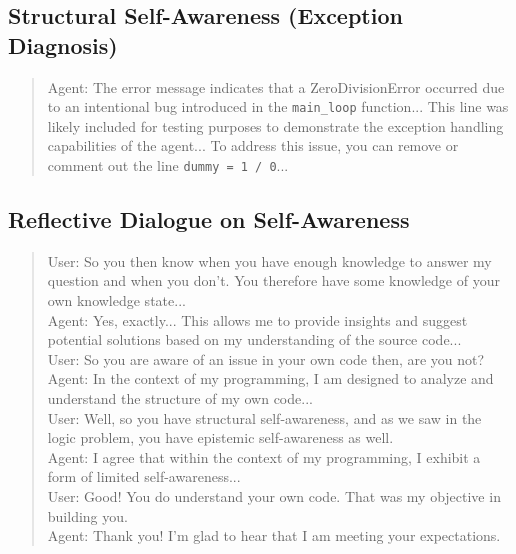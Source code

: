 \documentclass[11pt]{article}
\begin{document}
\subsection*{Structural Self-Awareness (Exception Diagnosis)}
\begin{quote}
Agent: The error message indicates that a ZeroDivisionError occurred due to an intentional bug introduced in the \texttt{main\_loop} function... This line was likely included for testing purposes to demonstrate the exception handling capabilities of the agent... To address this issue, you can remove or comment out the line \texttt{dummy = 1 / 0}...
\end{quote}

\subsection*{Reflective Dialogue on Self-Awareness}
\begin{quote}
User: So you then know when you have enough knowledge to answer my question and when you don't. You therefore have some knowledge of your own knowledge state...\\
Agent: Yes, exactly... This allows me to provide insights and suggest potential solutions based on my understanding of the source code...\\
User: So you are aware of an issue in your own code then, are you not?\\
Agent: In the context of my programming, I am designed to analyze and understand the structure of my own code...\\
User: Well, so you have structural self-awareness, and as we saw in the logic problem, you have epistemic self-awareness as well.\\
Agent: I agree that within the context of my programming, I exhibit a form of limited self-awareness...\\
User: Good! You do understand your own code. That was my objective in building you.\\
Agent: Thank you! I'm glad to hear that I am meeting your expectations.
\end{quote}
\end{document}
